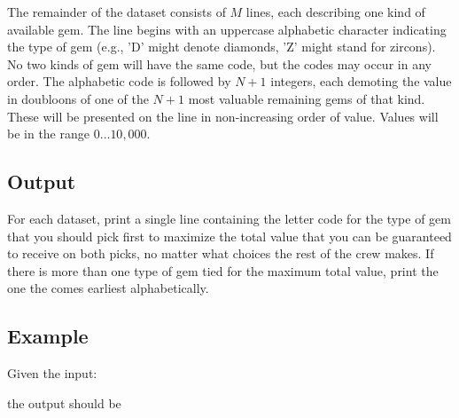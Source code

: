 The remainder of the dataset consists of $M$ lines, each describing one
kind of available gem. The line begins with an uppercase alphabetic
character indicating the type of gem (e.g., 'D' might denote diamonds,
'Z' might stand for zircons). No two kinds of gem will have the same
code, but the codes may occur in any order.  The alphabetic code is
followed by $N+1$ integers, each demoting the value in doubloons of one
of the $N+1$ most valuable remaining gems of that kind. These will be
presented on the line in non-increasing order of value.  Values will
be in the range $0\ldots 10,000$.

\subsection*{Output}

For each dataset, print a single line containing the letter code for
the type of gem that you should pick first to maximize the total value
that you can be guaranteed to receive on both picks, no matter what
choices the rest of the crew makes.  If there is more than one type of
gem tied for the maximum total value, print the one the comes earliest
alphabetically.


\subsection*{Example}

Given the input:



the output should be

